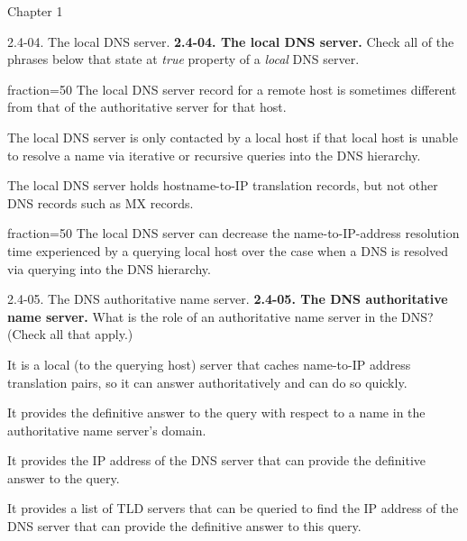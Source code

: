 \documentclass[a4paper]{article}
\begin{document}
\begin{quiz}{Chapter 1}
\begin{multi}[points=1,shuffle,multiple]{2.4-04. The local DNS server.}
\textbf{2.4-04. The local DNS server.} Check all of the phrases below that state at\emph{ true} property of a \emph{local }DNS server.
\item[fraction=50] The local DNS server record for a remote host is sometimes different from that of the authoritative server for that host.
\item The local DNS server is only contacted by a local host if that local host is unable to resolve a name via iterative or recursive queries into the DNS hierarchy.
\item The local DNS server holds hostname-to-IP translation records, but not other DNS records such as MX records.
\item[fraction=50] The local DNS server can decrease the name-to-IP-address resolution time experienced by a querying local host over the case when a DNS is resolved via querying into the DNS hierarchy.
\end{multi}

\begin{multi}[points=1,shuffle,multiple]{2.4-05. The DNS authoritative name server.}
\textbf{2.4-05. The DNS authoritative name server.} What is the role of an authoritative name server in the DNS? (Check all that apply.)
\item It is a local (to the querying host) server that caches name-to-IP address translation pairs, so it can answer authoritatively and can do so quickly.
\item* It provides the definitive answer to the query with respect to a name in the authoritative name server's domain.
\item It provides the IP address of the DNS server that can provide the definitive answer to the query.
\item It provides a list of TLD servers that can be queried to find the IP address of the DNS server that can provide the definitive answer to this query.
\end{multi}


\end{quiz}
\end{document}
